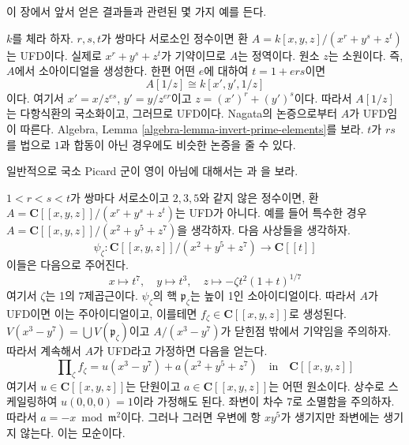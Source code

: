 \noindent
이 장에서 앞서 얻은 결과들과 관련된 몇 가지 예를 든다.

\begin{example}
\label{example-factorial}
\begin{reference}
\cite[4(c)]{Samuel-UFD}
\end{reference}
$k$를 체라 하자. $r, s, t$가 쌍마다 서로소인 정수이면 환
$A = k[x, y, z]/(x^r + y^s + z^t)$는 UFD이다.
실제로 $x^r + y^s + z^t$가 기약이므로 $A$는 정역이다.
원소 $z$는 소원이다. 즉, $A$에서 소아이디얼을 생성한다.
한편 어떤 $e$에 대하여 $t = 1 + ers$이면
$$
A[1/z] \cong k[x', y', 1/z]
$$
이다. 여기서 $x' = x/z^{es}$, $y' = y/z^{er}$이고
$z = (x')^r + (y')^s$이다.
따라서 $A[1/z]$는 다항식환의 국소화이고, 그러므로 UFD이다.
Nagata의 논증으로부터 $A$가 UFD임이 따른다.
Algebra, Lemma \ref{algebra-lemma-invert-prime-elements}를 보라.
$t$가 $rs$를 법으로 $1$과 합동이 아닌 경우에도 비슷한 논증을 줄 수 있다.
\end{example}

\begin{example}
\label{example-completion-not-factorial}
\begin{reference}
일반적으로 국소 Picard 군이 영이 아님에 대해서는
\cite{Brieskorn}과 \cite{Lipman-rational}을 보라.
\end{reference}
$1 < r < s < t$가 쌍마다 서로소이고 $2, 3, 5$와 같지 않은 정수이면,
환 $A = \mathbf{C}[[x, y, z]]/(x^r + y^s + z^t)$는 UFD가 아니다.
예를 들어 특수한 경우
$A = \mathbf{C}[[x, y, z]]/(x^2 + y^5 + z^7)$을 생각하자.
다음 사상들을 생각하자.
$$
\psi_\zeta : \mathbf{C}[[x, y, z]]/(x^2 + y^5 + z^7) \to \mathbf{C}[[t]]
$$
이들은 다음으로 주어진다.
$$
x \mapsto t^7,\quad
y \mapsto t^3,\quad
z \mapsto -\zeta t^2(1 + t)^{1/7}
$$
여기서 $\zeta$는 1의 $7$제곱근이다.
$\psi_\zeta$의 핵 $\mathfrak p_\zeta$는 높이 1인 소아이디얼이다.
따라서 $A$가 UFD이면 이는 주아이디얼이고, 이를테면
$f_\zeta \in \mathbf{C}[[x, y, z]]$로 생성된다.
$V(x^3 - y^7) = \bigcup V(\mathfrak p_\zeta)$이고
$A/(x^3 - y^7)$가 닫힌점 밖에서 기약임을 주의하자.
따라서 계속해서 $A$가 UFD라고 가정하면 다음을 얻는다.
$$
\prod\nolimits_\zeta f_\zeta = u(x^3 - y^7) + a(x^2 + y^5 + z^7)
\quad\text{in}\quad
\mathbf{C}[[x, y, z]]
$$
여기서 $u \in \mathbf{C}[[x, y, z]]$는 단원이고
$a \in \mathbf{C}[[x, y, z]]$는 어떤 원소이다.
상수로 스케일링하여 $u(0, 0, 0) = 1$이라 가정해도 된다.
좌변이 차수 $7$로 소멸함을 주의하자.
따라서 $a = - x \bmod \mathfrak m^2$이다.
그러나 그러면 우변에 항 $xy^5$가 생기지만 좌변에는 생기지 않는다.
이는 모순이다.
\end{example}

